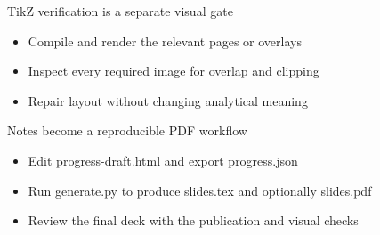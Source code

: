 \documentclass[aspectratio=169,14pt]{beamer}
\begin{document}
\begin{frame}{TikZ verification is a separate visual gate}
\begin{itemize}
  \item Compile and render the relevant pages or overlays
  \item Inspect every required image for overlap and clipping
  \item Repair layout without changing analytical meaning
\end{itemize}
\end{frame}

\begin{frame}{Notes become a reproducible PDF workflow}
\begin{itemize}
  \item Edit progress-draft.html and export progress.json
  \item Run generate.py to produce slides.tex and optionally slides.pdf
  \item Review the final deck with the publication and visual checks
\end{itemize}
\end{frame}
\end{document}
